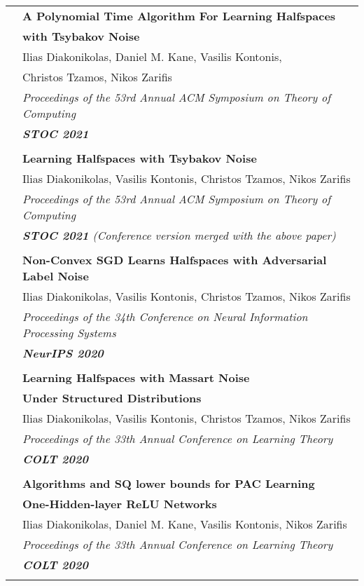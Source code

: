\documentclass[letterpaper,11pt,oneside]{article}
\begin{document}
\begin{longtable}{@{} l l}
     &\textbf{A Polynomial Time Algorithm For Learning Halfspaces}\\
     & \textbf{with Tsybakov Noise}\\
     & Ilias Diakonikolas, Daniel M. Kane, Vasilis Kontonis,\\
     & Christos Tzamos, Nikos Zarifis \\
     & \emph{Proceedings of the 53rd Annual ACM Symposium on Theory of Computing}\\
     & \emph{\textbf{STOC 2021}} \\
     & \\

     &\textbf{Learning Halfspaces with Tsybakov Noise}\\
     & Ilias Diakonikolas, Vasilis Kontonis, Christos Tzamos, Nikos Zarifis \\
     & \emph{Proceedings of the 53rd Annual ACM Symposium on Theory of Computing} \\
     & \emph{\textbf{STOC 2021} 
     (Conference version merged with the above paper)
     } \\
     & \\



     &\textbf{Non-Convex SGD Learns Halfspaces with Adversarial Label Noise} \\
     & Ilias Diakonikolas, Vasilis Kontonis, Christos Tzamos, Nikos Zarifis \\
     & \emph{Proceedings of the 34th Conference on Neural Information Processing Systems} \\
     & \emph{\textbf{NeurIPS 2020}} \\
     & \\

     &\textbf{Learning Halfspaces with Massart Noise}\\
     &\textbf{Under Structured Distributions}\\
     & Ilias Diakonikolas, Vasilis Kontonis, Christos Tzamos, Nikos Zarifis \\
     & \emph{Proceedings of the 33th Annual Conference on Learning Theory} \\
     & \emph{\textbf{COLT 2020}} \\
     & \\

     &\textbf{Algorithms and SQ lower bounds for PAC Learning} \\
     & \textbf{One-Hidden-layer ReLU Networks}\\
     & Ilias Diakonikolas, Daniel M. Kane, Vasilis Kontonis, Nikos Zarifis \\
     & \emph{Proceedings of the 33th Annual Conference on Learning Theory} \\
     & \emph{\textbf{COLT 2020}} \\
     & \\


\end{longtable}
\end{document}

